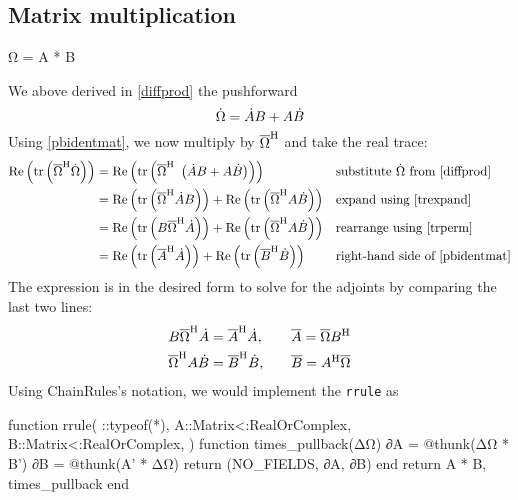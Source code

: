 \documentclass[../../main.tex]{subfiles}
\begin{document}
\begin{refsection}
\subsection{Matrix multiplication}\label{matrix-multiplication-1}
\begin{juliacode}
Ω = A * B
\end{juliacode}
We above derived in \eqref{diffprod} the pushforward
\[\dot{\Omega} = \dot{A} B + A \dot{B}\]
Using \eqref{pbidentmat}, we now multiply by ${\overline{\Omega}}^\mathrm{H}$ and take the real trace:
\begin{align*}
	\Re\left( \tr \left(
		{\overline{\Omega}}^\mathrm{H} \dot{\Omega}
		\right) \right)
	 & = \Re\left( \tr \left( {\overline{\Omega}}^\mathrm{H} ~\left(
		\dot{A} B + A \dot{B}
		\right) \right) \right)
	 &                                                      & \text{substitute } \dot{\Omega} \text{ from } \eqref{diffprod} \\
	 & = \Re\left( \tr \left(
		{\overline{\Omega}}^\mathrm{H} \dot{A} B
		\right) \right) +
	\Re\left( \tr \left(
		{\overline{\Omega}}^\mathrm{H}  A \dot{B}
		\right) \right)
	 &                                                      & \text{expand using } \eqref{trexpand}                           \\
	 & = \Re\left( \tr \left(
		B {\overline{\Omega}}^\mathrm{H} \dot{A}
		\right) \right) +
	\Re\left( \tr \left(
		{\overline{\Omega}}^\mathrm{H} A \dot{B}
		\right) \right)
	 &                                                      & \text{rearrange using } \eqref{trperm}                          \\
	 & = \Re\left( \tr \left(
		{\overline{A}}^\mathrm{H}  \dot{A}
		\right) \right) +
	\Re\left( \tr \left(
		{\overline{B}}^\mathrm{H} \dot{B}
		\right) \right)
	 &                                                      & \text{right-hand side of } \eqref{pbidentmat}
\end{align*}
The expression is in the desired form to solve for the adjoints by comparing the last two lines:
\begin{align*}
	B {\overline{\Omega}}^\mathrm{H} \dot{A} & = {\overline{A}}^\mathrm{H}  \dot{A}, \quad
	                                 &                                     & \overline{A} = \overline{\Omega} {B}^\mathrm{H} \\
	{\overline{\Omega}}^\mathrm{H} A \dot{B} & = {\overline{B}}^\mathrm{H} \dot{B}, \quad
	                                 &                                     & \overline{B} = {A}^\mathrm{H} \overline{\Omega}
\end{align*}
Using ChainRules's notation, we would implement the \texttt{rrule} as
\begin{juliacode}
function rrule(
    ::typeof(*),
    A::Matrix{<:RealOrComplex},
    B::Matrix{<:RealOrComplex},
)
    function times_pullback(ΔΩ)
        ∂A = @thunk(ΔΩ * B')
        ∂B = @thunk(A' * ΔΩ)
        return (NO_FIELDS, ∂A, ∂B)
    end
    return A * B, times_pullback
end
\end{juliacode}

\end{refsection}
\end{document}
